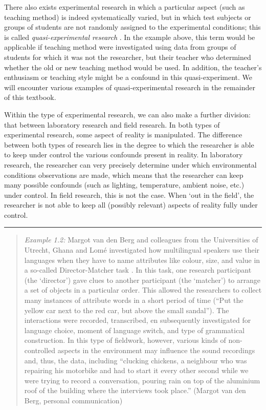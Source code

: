 \documentclass[
]{book}
\begin{document}
There also exists experimental research in which a particular aspect (such as teaching method) is indeed systematically varied, but in which test subjects or groups of students are not randomly assigned to the experimental conditions; this is called \emph{quasi-experimental research} \citep{SCC02}. In the example above, this term would be applicable if teaching method were investigated using data from groups of students for which it was not the researcher, but their teacher who determined whether the old or new teaching method would be used. In addition, the teacher's enthusiasm or teaching style might be a confound in this quasi-experiment. We will encounter various examples of quasi-experimental research in the remainder of this textbook.

Within the type of experimental research, we can also make a further division: that between laboratory research and field research. In both types of experimental research, some aspect of reality is manipulated. The difference between both types of research lies in the degree to which the researcher is able to keep under control the various confounds present in reality. In laboratory research, the researcher can very precisely determine under which environmental conditions observations are made, which means that the researcher can keep many possible confounds (such as lighting, temperature, ambient noise, etc.) under control. In field research, this is not the case. When `out in the field', the researcher is not able to keep all (possibly relevant) aspects of reality fully under control.

\begin{center}\rule{0.5\linewidth}{0.5pt}\end{center}

\begin{quote}
\emph{Example 1.2:} Margot van den Berg and colleagues from the Universities of Utrecht, Ghana and Lomé investigated how multilingual speakers use their languages when they have to name attributes like colour, size, and value in a so-called Director-Matcher task \citep{BAEYT2017}. In this task, one research participant (the `director') gave clues to another participant (the `matcher') to arrange a set of objects in a particular order. This allowed the researchers to collect many instances of attribute words in a short period of time (``Put the yellow car next to the red car, but above the small sandal''). The interactions were recorded, transcribed, en subsequently investigated for language choice, moment of language switch, and type of grammatical construction. In this type of fieldwork, however, various kinds of non-controlled aspects in the environment may influence the sound recordings and, thus, the data, including ``clucking chickens, a neighbour who was repairing his motorbike and had to start it every other second while we were trying to record a conversation, pouring rain on top of the aluminium roof of the building where the interviews took place.'' (Margot van den Berg, personal communication)
\end{quote}
\end{document}
